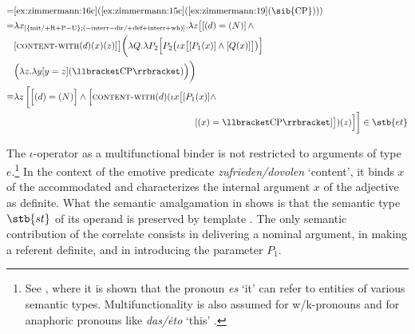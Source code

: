 \documentclass[output=paper]{langscibook}
\begin{document}
\ea\label{ex:zimmermann:20} 
 \medskip\\\noindent
\begin{equation*}\begin{split}
 = & \text{\ref{ex:zimmermann:16c}(\ref{ex:zimmermann:15c}(\ref{ex:zimmermann:19}(\sib{CP})))}\\
 = & \lambda x\textsubscript{[\{mit/$+$R$+$P$-$U\};($-$interr$-$dir/$+$def$+$interr$+$wh)]} . \lambda z \big[[(d) = (N)] \, \wedge\\
   & [\textsc{content-with} (d) (x) (z)]\big] \bigg(\lambda Q . \lambda P_2 \Big[P_2 \big(\iota x \big[[P_1(x)] \wedge [Q (x)]\big]\big)\Big]\\
   & \Big(\lambda z . \lambda y [y = z] (\llbracket \text{CP}\rrbracket)\Big)\bigg) \\
\equiv & \lambda z \, \bigg[\Big[(d) = (N)\Big] \wedge \Big[\textsc{content-with} (d) (\iota x \big[[P_1 (x)] \wedge \\
       & \hspace{7cm} [(x) = \llbracket\text{CP}\rrbracket]\big]) (z)\Big]\bigg] \in \stb{et}
\end{split}\end{equation*}
\z

\noindent The $\iota$-operator as a multifunctional binder is not restricted to arguments of type $e$.\footnote{See \citet{Zimmermann2016a}, where it is shown that the pronoun \textit{es} `it' can refer to entities of various semantic types. Multifunctionality is also assumed for w/k-pronouns and for anaphoric pronouns like \textit{das/ėto} `this' \citep{Zimmermann2019c}.} In the context of the emotive predicate \textit{zufrieden/dovolen} `content', it binds $x$ of the accommodated  and characterizes the internal argument $x$ of the adjective as definite. What the semantic amalgamation in  shows is that the semantic type $\stb{st}$ of its operand  is preserved by template . The only semantic contribution of the correlate consists in delivering a nominal argument, in making a referent definite, and in introducing the parameter $P_1$.
\end{document}
